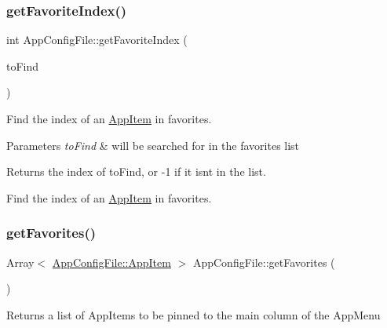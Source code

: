 \subsubsection{\texorpdfstring{get\+Favorite\+Index()}{getFavoriteIndex()}}
{\footnotesize\ttfamily int App\+Config\+File\+::get\+Favorite\+Index (\begin{DoxyParamCaption}\item[{\mbox{\hyperlink{structAppConfigFile_1_1AppItem}{App\+Config\+File\+::\+App\+Item}}}]{to\+Find }\end{DoxyParamCaption})}

Find the index of an \mbox{\hyperlink{structAppConfigFile_1_1AppItem}{App\+Item}} in favorites.


\begin{DoxyParams}{Parameters}
{\em to\+Find} & will be searched for in the favorites list\\
\hline
\end{DoxyParams}
\begin{DoxyReturn}{Returns}
the index of to\+Find, or -\/1 if it isn\textquotesingle{}t in the list.
\end{DoxyReturn}
Find the index of an \mbox{\hyperlink{structAppConfigFile_1_1AppItem}{App\+Item}} in favorites. \mbox{\label{classAppConfigFile_adafa59cdb408a3b4a29d5bc247120c21}} 
\subsubsection{\texorpdfstring{get\+Favorites()}{getFavorites()}}
{\footnotesize\ttfamily Array$<$ \mbox{\hyperlink{structAppConfigFile_1_1AppItem}{App\+Config\+File\+::\+App\+Item}} $>$ App\+Config\+File\+::get\+Favorites (\begin{DoxyParamCaption}{ }\end{DoxyParamCaption})}

\begin{DoxyReturn}{Returns}
a list of App\+Items to be pinned to the main column of the App\+Menu 
\end{DoxyReturn}
\mbox{\label{classAppConfigFile_aa9ad1776ef603daf34e26cb35be8c123}} 
